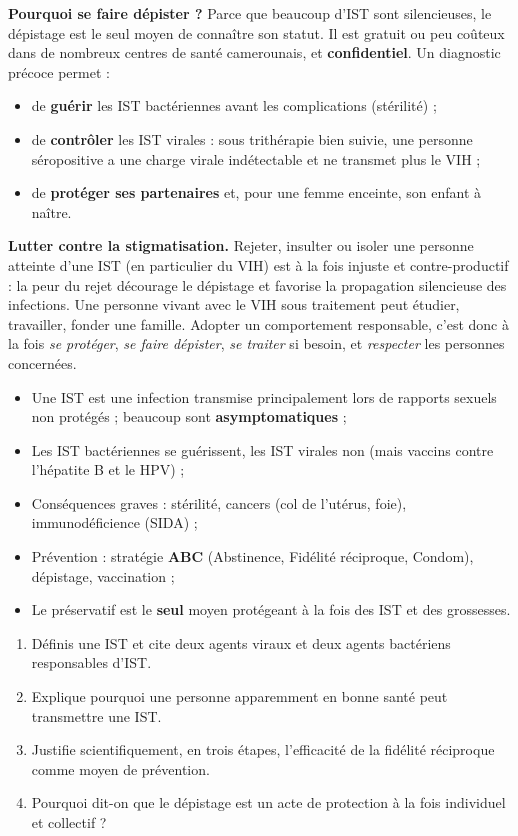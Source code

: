 \documentclass[11pt]{article}
\begin{document}
\textbf{Pourquoi se faire dépister ?} Parce que beaucoup d'IST sont silencieuses, le dépistage est le seul moyen de connaître son statut. Il est gratuit ou peu coûteux dans de nombreux centres de santé camerounais, et \textbf{confidentiel}. Un diagnostic précoce permet :
\begin{itemize}
\item de \textbf{guérir} les IST bactériennes avant les complications (stérilité) ;
\item de \textbf{contrôler} les IST virales : sous trithérapie bien suivie, une personne séropositive a une charge virale indétectable et ne transmet plus le VIH ;
\item de \textbf{protéger ses partenaires} et, pour une femme enceinte, son enfant à naître.
\end{itemize}

\textbf{Lutter contre la stigmatisation.} Rejeter, insulter ou isoler une personne atteinte d'une IST (en particulier du VIH) est à la fois injuste et contre-productif : la peur du rejet décourage le dépistage et favorise la propagation silencieuse des infections. Une personne vivant avec le VIH sous traitement peut étudier, travailler, fonder une famille. Adopter un comportement responsable, c'est donc à la fois \emph{se protéger}, \emph{se faire dépister}, \emph{se traiter} si besoin, et \emph{respecter} les personnes concernées.

\begin{aretenir}
\begin{itemize}
\item Une IST est une infection transmise principalement lors de rapports sexuels non protégés ; beaucoup sont \textbf{asymptomatiques} ;
\item Les IST bactériennes se guérissent, les IST virales non (mais vaccins contre l'hépatite B et le HPV) ;
\item Conséquences graves : stérilité, cancers (col de l'utérus, foie), immunodéficience (SIDA) ;
\item Prévention : stratégie \textbf{ABC} (Abstinence, Fidélité réciproque, Condom), dépistage, vaccination ;
\item Le préservatif est le \textbf{seul} moyen protégeant à la fois des IST et des grossesses.
\end{itemize}
\end{aretenir}

\begin{exercice}
\begin{enumerate}
\item Définis une IST et cite deux agents viraux et deux agents bactériens responsables d'IST.
\item Explique pourquoi une personne apparemment en bonne santé peut transmettre une IST.
\item Justifie scientifiquement, en trois étapes, l'efficacité de la fidélité réciproque comme moyen de prévention.
\item Pourquoi dit-on que le dépistage est un acte de protection à la fois individuel et collectif ?
\end{enumerate}
\end{exercice}
\end{document}
